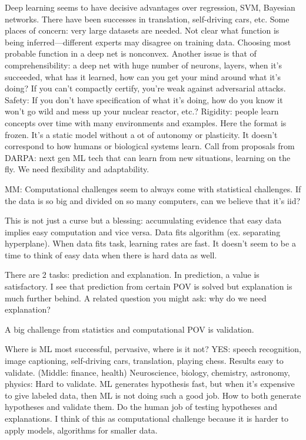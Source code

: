 Deep learning seems to have decisive advantages over regression, SVM, Bayesian  networks. There have been successes in translation, self-driving cars, etc. Some places of concern: very large datasets are needed. Not clear what function is being inferred---different experts may disagree on training data. Choosing most probable function in a deep net is nonconvex. Another issue is that of comprehensibility: a deep net with huge number of neurons, layers, when it's succeeded, what has it learned, how can you get your mind around what it's doing? If you can't compactly certify, you're weak against adversarial attacks. Safety: If you don't have specification of what it's doing, how do you know it won't go wild and mess up your nuclear reactor, etc.? Rigidity: people learn concepts over time with many environments and examples. Here the format is frozen. It's a static model without a ot of autonomy or plasticity. It doesn't correspond to how humans or biological systems learn. Call from proposals from DARPA: next gen ML tech that can learn from new situations, learning on the fly. We need flexibility and adaptability.

MM: Computational challenges seem to always come with statistical challenges. If the data is so big and divided on so many computers, can we believe that it's iid? 

This is not just a curse but a blessing: accumulating evidence that easy data implies easy computation and vice versa. Data fits algorithm (ex. separating hyperplane). When data fits task, learning rates are fast. 
It doesn't seem to be a time to think of easy data when there is hard data as well.

There are 2 tasks: prediction and explanation. In prediction, a value is satisfactory. I see that prediction from certain POV is solved but explanation is much further behind. A related question you might ask: why do we need explanation? 

A big challenge from statistics and computational POV is validation. 

Where is ML most successful, pervasive, where is it not?  YES: speech recognition, image captioning, self-driving cars, translation, playing chess. 
Results easy to validate.  (Middle: finance, health)
Neuroscience, biology, chemistry, astronomy, physics: Hard to validate. ML generates hypothesis fast, but when it's expensive to give labeled data, then ML is not doing such a good job. How to both generate hypotheses and validate them. Do the human job of testing hypotheses and explanations. I think of this as computational challenge because it is harder to apply models, algorithms for smaller data. 

